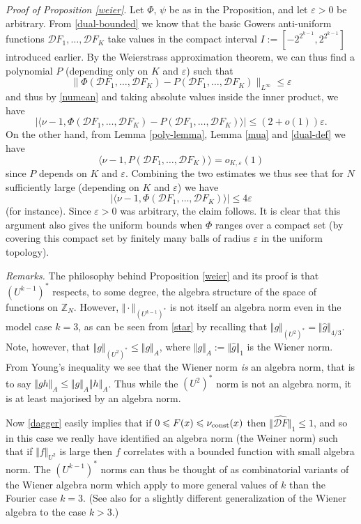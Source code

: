 \documentclass[12pt,a4paper,reqno]{amsart}
\numberwithin{equation}{section}
\theoremstyle{plain}
\theoremstyle{definition}
\renewcommand{\leq}{\leqslant}
\def\vconst{\ensuremath \nu_{\mbox{\scriptsize const}}}
\def\Z{{\mathbb Z}}
\def\eps{{\varepsilon}}
\def\vs{\vspace{11pt}}
\def\ni{\noindent}
\def\endproof{\hfill{\usebox{\proofbox}}}
\begin{document}
\noindent\textit{Proof of Proposition \ref{weier}}.
Let $\Phi$, $\psi$ be as in the Proposition, and let $\eps > 0$ be arbitrary.  From \eqref{dual-bounded} we know that the basic
Gowers anti-uniform functions ${\mathcal D} F_1, \ldots, {\mathcal D} F_K$ take values in the compact interval
$I := [-2^{2^{k-1}}, 2^{2^{k-1}}]$ introduced earlier.  By the
Weierstrass approximation theorem, we can thus find a polynomial $P$ (depending only on $K$ and $\eps$) 
such that
$$ \| \Phi({\mathcal D} F_1, \ldots, {\mathcal D} F_K) - P({\mathcal D} F_1, \ldots, {\mathcal D} F_K) \|_{L^\infty} \leq \eps$$
and thus by \eqref{numean} and taking absolute values inside the inner product, we have
$$ |\langle \nu - 1, \Phi({\mathcal D} F_1, \ldots, {\mathcal D} F_K) - P({\mathcal D} F_1, \ldots, {\mathcal D} F_K)
\rangle| \leq (2 + o(1)) \eps.$$
On the other hand, from Lemma \ref{poly-lemma}, Lemma \ref{mua} and \eqref{dual-def} we have
$$ \langle \nu - 1, P({\mathcal D} F_1, \ldots, {\mathcal D} F_K) \rangle = o_{K,\eps}(1)$$
since $P$ depends on $K$ and $\eps$.
Combining the two estimates we thus see that
for $N$ sufficiently large (depending on $K$ and $\eps$) we have
$$ |\langle \nu - 1, \Phi({\mathcal D} F_1, \ldots, {\mathcal D} F_K) \rangle| \leq 4\eps$$
(for instance).
Since $\eps > 0$ was arbitrary, the claim follows.  It is clear that this argument also gives the uniform bounds when
$\Phi$ ranges over a compact set (by covering this compact set by finitely many balls of radius $\eps$ in the uniform
topology).
\endproof\vspace{11pt}

\ni\textit{Remarks.} The philosophy behind Proposition \ref{weier} and its proof is that $(U^{k-1})^{*}$ respects, to some degree, the algebra structure of the space of functions on $\Z_N$. However, $\Vert \cdot \Vert_{(U^{k-1})^*}$ is not itself an algebra norm even in the model case 
$k=3$, as can be seen from \eqref{star} by recalling that $\Vert g \Vert_{(U^2)^*} = \Vert \widehat{g} \Vert_{4/3}$.  Note, however, that
$\Vert g \Vert_{(U^2)^*} \leq \Vert g \Vert_A$, where $\Vert g \Vert_A:= \Vert \widehat{g} \Vert_1$ is the Wiener norm.  From Young's inequality
we see that the Wiener norm \textit{is} an algebra norm, that is to say $\Vert gh \Vert_A \leq \Vert g \Vert_A \Vert h \Vert_A$. Thus while the $(U^2)^*$ norm is not an algebra norm, it is at least majorised by an algebra norm.\vs

\ni Now \eqref{dagger} easily implies that if $0 \leq F(x) \leq \vconst(x)$ then $\Vert \widehat{\mathcal{D}F} \Vert_1 \leq 1$, and so in this case we really have identified an algebra norm (the Weiner norm) such that if $\Vert f \Vert_{U^2}$ is large then $f$ correlates with a bounded function with small algebra norm. The $(U^{k-1})^*$ norms can thus be thought of as combinatorial variants of the Wiener algebra norm which apply
to more general values of $k$ than the Fourier case $k=3$.  (See also \cite{tao:ergodic} for a slightly different generalization of the Wiener
algebra to the case $k > 3$.)\vs
\end{document}
